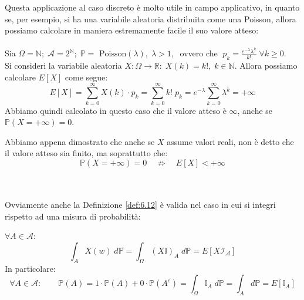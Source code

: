 \bigskip
\noindent Questa applicazione al caso discreto è molto utile in campo applicativo, in quanto se, per esempio, si ha una variabile aleatoria distribuita come una Poisson, allora possiamo calcolare in maniera estremamente facile il suo valore atteso:\\
\\
Sia $\Omega = \mathbb{N};\; \mathcal{A} = 2^\mathbb{N}; \; \mathbb{P} = \text{ Poisson}(\lambda), \; \lambda>1,\;$ ovvero che $\;p_k = \frac{e^{-\lambda}\lambda^k}{k!}\;\forall k\geq0$.\\
Si consideri la variabile aleatoria $X:\Omega\to\mathbb{R}:\; X(k) = k!, \;k\in\mathbb{N}$. Allora possiamo calcolare $E[X]$ come segue:
\[E[X] = \sum_{k=0}^\infty X(k)\cdot p_k = \sum_{k=0}^\infty k!\;p_k = e^{-\lambda} \sum_{k=0}^\infty\lambda^k = +\infty\]
Abbiamo quindi calcolato in questo caso che il valore atteso è $\infty$, anche se $\mathbb{P}(X = +\infty) = 0$.

\medskip
\noindent Abbiamo appena dimostrato che anche se $X$ assume valori reali, non è detto che il valore atteso sia finito, ma soprattutto che:
\[\mathbb{P}(X = +\infty) = 0 \quad \not\Rightarrow \quad E[X]  < + \infty\]


\bigskip
\noindent
{}\\
\\
Ovviamente anche la Definizione \ref{def:6.12} è valida nel caso in cui si integri rispetto ad una misura di probabilità:
\begin{definizione}
\label{def:7.7}
    $\forall A\in\mathcal{A}: $ 
    \[\int_AX(w) \;d\mathbb{P} = \int_\Omega (X\mathbb{I})_A\;d\mathbb{P} = E[X\mathcal{I_A}]\]
    In particolare:\[\forall A\in\mathcal{A}:\qquad \mathbb{P}(A) = 1\cdot \mathbb{P} (A)+ 0\cdot \mathbb{P}(A^c) = \int_\Omega \mathbb{I}_A\;d\mathbb{P} = \int_A d\mathbb{P} = E[\mathbb{I}_A]\]
\end{definizione}

